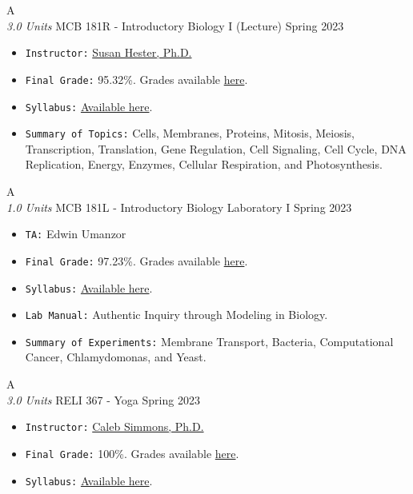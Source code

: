 \cventry
{A \\ \small{\textit{3.0 Units}}}
{MCB 181R - Introductory Biology I (Lecture)}
{Spring 2023}
{}
{}
{
  \begin{itemize}
    \item \texttt{Instructor:} \href{https://mcb.arizona.edu/profile/susan-hester}{Susan Hester, Ph.D.}
    \item \texttt{Final Grade:} 95.32\%. Grades available \href{https://mhrezaei.com/assets/cv/courses/Spring2023/MCB181R/Grades.pdf}{here}.
    \item \texttt{Syllabus:} \href{https://mhrezaei.com/assets/cv/courses/Spring2023/MCB181R/Syllabus.pdf}{Available here}.
    \item \texttt{Summary of Topics:} Cells, Membranes, Proteins, Mitosis, Meiosis, Transcription, Translation, Gene Regulation, Cell Signaling, Cell Cycle, DNA Replication, Energy, Enzymes, Cellular Respiration, and Photosynthesis.
  \end{itemize}
}

\cventry
{A \\ \small{\textit{1.0 Units}}}
{MCB 181L - Introductory Biology Laboratory I}
{Spring 2023}
{}
{}
{
  \begin{itemize}
    \item \texttt{TA:} Edwin Umanzor
    \item \texttt{Final Grade:} 97.23\%. Grades available \href{https://mhrezaei.com/assets/cv/courses/Spring2023/MCB181L/Grades.pdf}{here}.
    \item \texttt{Syllabus:} \href{https://mhrezaei.com/assets/cv/courses/Spring2023/MCB181L/Syllabus.pdf}{Available here}.
    \item \texttt{Lab Manual:} Authentic Inquiry through Modeling in Biology.
    \item \texttt{Summary of Experiments:} Membrane Transport, Bacteria, Computational Cancer, Chlamydomonas, and Yeast.
  \end{itemize}
}

\cventry
{A \\ \small{\textit{3.0 Units}}}
{RELI 367 - Yoga}
{Spring 2023}
{}
{}
{
  \begin{itemize}
    \item \texttt{Instructor:} \href{https://religion.arizona.edu/people/calebsimmons}{Caleb Simmons, Ph.D.}
    \item \texttt{Final Grade:} 100\%. Grades available \href{https://mhrezaei.com/assets/cv/courses/Spring2023/RELI367/Grades.pdf}{here}.
    \item \texttt{Syllabus:} \href{https://mhrezaei.com/assets/cv/courses/Spring2023/RELI367/Syllabus.pdf}{Available here}.
  \end{itemize}
}

